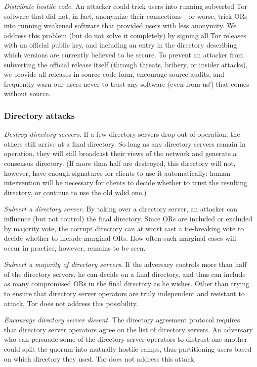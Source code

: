 \documentclass[times,10pt,twocolumn]{article}
\begin{document}
\emph{Distribute hostile code.} An attacker could trick users
into running subverted Tor software that did not, in fact, anonymize
their connections---or worse, trick ORs into running weakened
software that provided users with less anonymity.  We address this
problem (but do not solve it completely) by signing all Tor releases
with an official public key, and including an entry in the directory
describing which versions are currently believed to be secure.  To
prevent an attacker from subverting the official release itself
(through threats, bribery, or insider attacks), we provide all
releases in source code form, encourage source audits, and
frequently warn our users never to trust any software (even from
us!) that comes without source.

\subsubsection*{Directory attacks}

\emph{Destroy directory servers.}  If a few directory
servers drop out of operation, the others still arrive at a final
directory.  So long as any directory servers remain in operation,
they will still broadcast their views of the network and generate a
consensus directory.  (If more than half are destroyed, this
directory will not, however, have enough signatures for clients to
use it automatically; human intervention will be necessary for
clients to decide whether to trust the resulting directory, or continue
to use the old valid one.)

\emph{Subvert a directory server.}  By taking over a directory
server, an attacker can influence (but not control) the final
directory.  Since ORs are included or excluded by majority vote,
the corrupt directory can at worst cast a tie-breaking vote to
decide whether to include marginal ORs.  How often such marginal
cases will occur in practice, however, remains to be seen.

\emph{Subvert a majority of directory servers.}  If the
adversary controls more than half of the directory servers, he can
decide on a final directory, and thus can include as many
compromised ORs in the final directory as he wishes.  Other than
trying to ensure that directory server operators are truly
independent and resistant to attack, Tor does not address this
possibility.

\emph{Encourage directory server dissent.}  The directory
agreement protocol requires that directory server operators agree on 
the list of directory servers.  An adversary who can persuade some
of the directory server operators to distrust one another could
split the quorum into mutually hostile camps, thus partitioning
users based on which directory they used.  Tor does not address
this attack.
\end{document}

